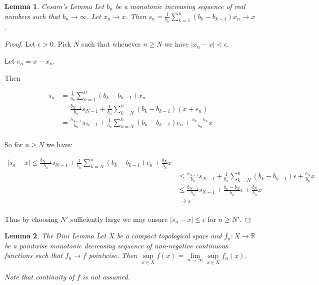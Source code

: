 \documentclass[a4paper]{book}
\newtheorem{lemma}{Lemma}[section]
\begin{document}
\begin{lemma}{Cesaro's Lemma}
Let \(b_n\) be a monotonic increasing sequence of real numbers such that \(b_n \to \infty\).
Let \(x_n \to x\).
Then \(s_n = \frac{1}{b_n} \sum\limits_{k = 1}^n (b_k - b_{k - 1}) x_n \to x\).
\end{lemma}

\begin{proof}
Let \(\epsilon > 0\).
Pick \(N\) such that whenever \(n \geq N\) we have \(|x_n - x| < \epsilon\).

Let \(e_n = x - x_n\).

Then 

\begin{align*}
s_n &= \frac{1}{b_n} \sum\limits_{k = 1}^n (b_k - b_{k - 1}) x_n\\
&= \frac{b_{N - 1}}{b_n} s_{N - 1} + \frac{1}{b_n} \sum\limits_{k = N}^n (b_k - b_{k - 1}) (x + e_n) \\
&= \frac{b_{N - 1}}{b_n} s_{N - 1} + \frac{1}{b_n} \sum\limits_{k = N}^n (b_k - b_{k - 1}) e_n + \frac{b_n - b_N}{b_n} x \\
\end{align*}

So for \(n \geq N\) we have:

\begin{align*}
|s_n - x| \leq \frac{b_{N - 1}}{b_n} s_{N - 1} + \frac{1}{b_n} \sum\limits_{k = N}^n (b_k - b_{k - 1}) e_n + \frac{b_N}{b_n} x \\
&\leq \frac{b_{N - 1}}{b_n} s_{N - 1} + \frac{1}{b_n} \sum\limits_{k = N}^n (b_k - b_{k - 1}) \epsilon + \frac{b_N}{b_n} x \\
&\leq \frac{b_{N - 1}}{b_n} s_{N - 1} + \frac{b_n - b_N}{b_n} \epsilon + \frac{b_N}{b_n} x \\
&\to \epsilon \\
\end{align*}

Thus by choosing \(N'\) sufficiently large we may ensure \(|s_n - x| \leq \epsilon\) for \(n \geq N'\).
\end{proof}

\begin{lemma}{The Dini Lemma}
Let \(X\) be a compact topological space and \(f_n: X \to \mathbb{R}\) be a pointwise monotonic decreasing sequence of non-negative continuous functions such that \(f_n \to f\) pointwise.
Then \(\sup\limits_{x \in X} f(x) = \lim\limits_{n \to \infty} \sup\limits_{x \in X} f_n(x)\).

Note that continuity of \(f\) is not assumed.
\end{lemma}
\end{document}
